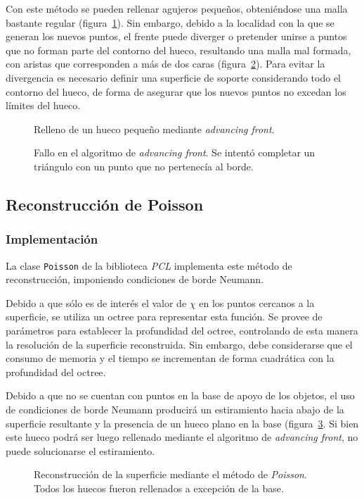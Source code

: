 		Con este método se pueden rellenar agujeros pequeños, obteniéndose una malla bastante regular (figura~\ref{fig:fill_good}).
		Sin embargo, debido a la localidad con la que se generan los nuevos
		puntos, el frente puede diverger o pretender unirse a puntos que no
		forman parte del contorno del hueco, resultando una malla mal formada,
		con aristas que corresponden a más de dos caras (figura~\ref{fig:fill_bad}).
		Para evitar la divergencia es necesario definir una superficie de
		soporte considerando todo el contorno del hueco, de forma de asegurar
		que los nuevos puntos no excedan los límites del hueco.

	\begin{figure}
		\caption{\label{fig:fill_good}Relleno de un hueco pequeño mediante \emph{advancing front}.}
	\end{figure}

	\begin{figure}
		\caption{\label{fig:fill_bad}Fallo en el algoritmo de \emph{advancing front}. Se intentó completar un triángulo con un punto que no pertenecía al borde.}
	\end{figure}

	\subsection{Reconstrucción de Poisson}
	\subsubsection{Implementación}
	La clase \texttt{Poisson} de la biblioteca \emph{PCL} implementa este método de reconstrucción,
	imponiendo condiciones de borde Neumann.

	Debido a que sólo es de interés el valor de $\chi$ en los puntos cercanos a
	la superficie, se utiliza un octree para representar esta función. Se
	provee de parámetros para establecer la profundidad del octree, controlando
	de esta manera la resolución de la superficie reconstruida.
	Sin embargo, debe considerarse que el consumo de memoria y el tiempo se incrementan de forma
	cuadrática con la profundidad del octree.

	Debido a que no se cuentan con puntos en la base de apoyo de los objetos, el uso de condiciones de borde Neumann
	producirá un estiramiento hacia abajo de la superficie resultante y la presencia de
	un hueco plano en la base (figura~\ref{fig:fill_poisson}.
	Si bien este hueco podrá ser luego rellenado mediante el algoritmo de \emph{advancing front}, no puede solucionarse el estiramiento.



	\begin{figure}
		 
		\caption{\label{fig:fill_poisson}Reconstrucción de la superficie mediante el método de \emph{Poisson}. Todos los huecos fueron rellenados a excepción de la base.}
	\end{figure}

